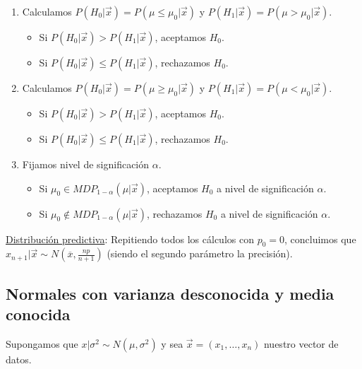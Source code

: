 \begin{enumerate}
    \item Calculamos $P(H_0 | \vec{x}) = P(\mu\leq \mu_0 |\vec{x})$ y $P(H_1 | \vec{x}) = P(\mu> \mu_0 | \vec{x})$.
    \begin{itemize}
        \item Si $P(H_0 | \vec{x}) > P(H_1 | \vec{x})$, aceptamos $H_0$.
        \item Si $P(H_0 | \vec{x}) \leq P(H_1 | \vec{x})$, rechazamos $H_0$.
    \end{itemize}
        \item Calculamos $P(H_0 | \vec{x}) = P(\mu \ge \mu_0 |\vec{x})$ y $P(H_1 | \vec{x}) = P(\mu < \mu_0 | \vec{x})$.
    \begin{itemize}
        \item Si $P(H_0 | \vec{x}) > P(H_1 | \vec{x})$, aceptamos $H_0$.
        \item Si $P(H_0 | \vec{x}) \leq P(H_1 | \vec{x})$, rechazamos $H_0$.
    \end{itemize}
    \item Fijamos nivel de significación $\alpha$.
    \begin{itemize}
        \item Si $\mu_0 \in MDP_{1 - \alpha}(\mu | \vec{x})$, aceptamos $H_0$ a nivel de significación $\alpha$.
        \item Si $\mu_0 \not\in MDP_{1 - \alpha}(\mu| \vec{x})$, rechazamos $H_0$ a nivel de significación $\alpha$.
    \end{itemize}
\end{enumerate}
\noindent \underline{Distribución predictiva}:
Repitiendo todos los cálculos con $p_0 = 0$, concluimos que $x_{n+1} | \vec{x} \sim N\left( \overline{x}, \frac{np}{n+1} \right)$ (siendo el segundo parámetro la precisión).

\subsection{Normales con varianza desconocida y media conocida}

\noindent Supongamos que $x | \sigma^2 \sim N(\mu,\sigma^2)$ y sea $\vec{x} = (x_1, \ldots, x_n)$ nuestro vector de datos.

